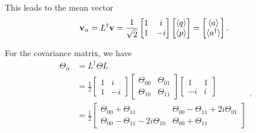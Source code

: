 \begin{apendicesenv}
\noindent This leads to the mean vector
\begin{equation}
    \mathbf{v}_\alpha = L^\dagger \mathbf{v} = \frac{1}{\sqrt{2}} \begin{bmatrix}
        1& i\\
        1& -i
    \end{bmatrix}
    \begin{bmatrix}
        \braket{q}\\
        \braket{p}
    \end{bmatrix}= 
    \begin{bmatrix} 
        \braket{a}\\
        \braket{a^\dagger}
    \end{bmatrix}.
\end{equation}

\noindent For the covariance matrix, we have
\begin{equation}
    \begin{split}
    \Theta_{\alpha} &= L^\dagger \Theta L\\ 
    &= \frac{1}{2} \begin{bmatrix}
    1& i\\
    1& -i
    \end{bmatrix}
    \begin{bmatrix}
    \Theta_{00}& \Theta_{01}\\
    \Theta_{10}& \Theta_{11}
    \end{bmatrix}
    \begin{bmatrix}
    1& 1\\
    -i& i
    \end{bmatrix}\\
    &= \frac{1}{2} \begin{bmatrix}
    \Theta_{00} + \Theta_{11}& \Theta_{00} - \Theta_{11} + 2i\Theta_{01}\\
    \Theta_{00} - \Theta_{11} -2i\Theta_{10}& \Theta_{00} + \Theta_{11}
    \end{bmatrix}
    \end{split}.
    \label{eq:covariance-alpha}
\end{equation}


\end{apendicesenv}
